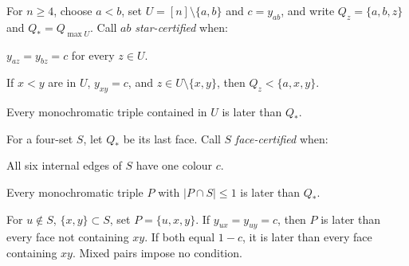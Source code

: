 \documentclass[a4paper,10pt]{amsart}
\theoremstyle{remark}
\begin{document}
For $n\ge4$, choose $a<b$, set $U=[n]\setminus\{a,b\}$ and
$c=y_{ab}$, and write $Q_z=\{a,b,z\}$ and $Q_*=Q_{\max U}$.
Call $ab$ \emph{star-certified} when:
\begin{description}[leftmargin=2.7em,labelwidth=2.3em]
\item[S1] $y_{az}=y_{bz}=c$ for every $z\in U$.
\item[S2] If $x<y$ are in $U$, $y_{xy}=c$, and
$z\in U\setminus\{x,y\}$, then $Q_z<\{a,x,y\}$.
\item[S3] Every monochromatic triple contained in $U$ is later than $Q_*$.
\end{description}
For a four-set $S$, let $Q_*$ be its last face. Call $S$
\emph{face-certified} when:
\begin{description}[leftmargin=2.7em,labelwidth=2.3em]
\item[K1] All six internal edges of $S$ have one colour $c$.
\item[K2] Every monochromatic triple $P$ with $|P\cap S|\le1$
is later than $Q_*$.
\item[K3] For $u\notin S$, $\{x,y\}\subset S$, set $P=\{u,x,y\}$.
If $y_{ux}=y_{uy}=c$, then $P$ is later than every face not containing
$xy$. If both equal $1-c$, it is later than every face containing $xy$.
Mixed pairs impose no condition.
\end{description}
\end{document}
